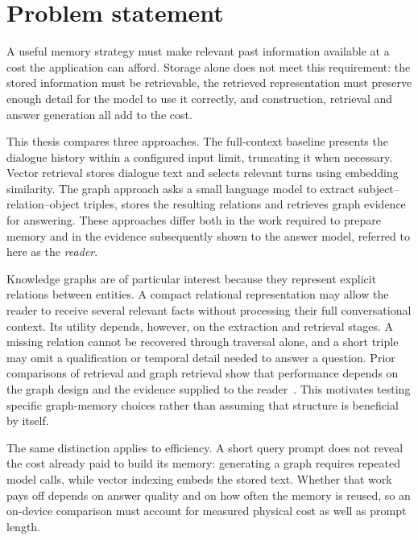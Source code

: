 \section{Problem statement}
\label{sec:ch1_problem}

A useful memory strategy must make relevant past information available at a cost the
application can afford. Storage alone does not meet this requirement: the stored information
must be retrievable, the retrieved representation must preserve enough detail for the model to
use it correctly, and construction, retrieval and answer generation all add to the cost.

This thesis compares three approaches. The full-context baseline presents the dialogue
history within a configured input limit, truncating it when necessary. Vector retrieval
stores dialogue text and selects relevant turns using embedding similarity. The graph
approach asks a small language model to extract subject--relation--object triples, stores
the resulting relations and retrieves graph evidence for answering. These approaches
differ both in the work required to prepare memory and in the evidence subsequently
shown to the answer model, referred to here as the \emph{reader}.

Knowledge graphs are of particular interest because they represent explicit relations
between entities. A compact relational representation may allow the reader to receive
several relevant facts without processing their full conversational context. Its utility
depends, however, on the extraction and retrieval stages. A missing relation cannot be
recovered through traversal alone, and a short triple may omit a qualification or
temporal detail needed to answer a question. Prior comparisons of retrieval and graph
retrieval show that performance depends on the graph design and the evidence supplied
to the reader~\citep{rag_vs_graphrag}. This motivates testing specific graph-memory
choices rather than assuming that structure is beneficial by itself.

The same distinction applies to efficiency. A short query prompt does not reveal the cost
already paid to build its memory: generating a graph requires repeated model calls, while
vector indexing embeds the stored text. Whether that work pays off depends on answer quality
and on how often the memory is reused, so an on-device comparison must account for measured
physical cost as well as prompt length.

